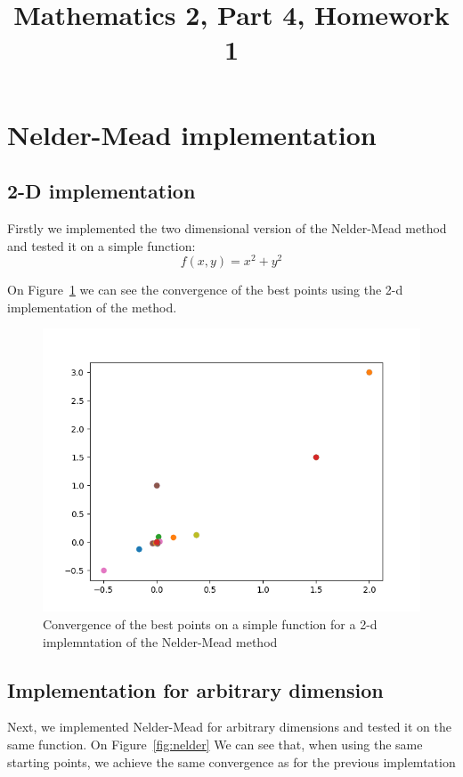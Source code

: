 \documentclass[9pt]{IEEEtran}
\title{\vspace{0ex}
Mathematics 2, Part 4, Homework 1}
\begin{document}
\maketitle
\section{Nelder-Mead implementation}
\subsection*{2-D implementation}
Firstly we implemented the two dimensional version of the Nelder-Mead method
 and tested it on a simple function: 
 \[f(x, y) = x^2 + y^2 \]

 On Figure~\ref{fig:nelder_2d} we can see the convergence of the best points using 
 the 2-d implementation of the method. 

\begin{figure}[h]
    \includegraphics[width=\columnwidth]{convergence1.png}
    \caption{Convergence of the best points on a simple function for a 2-d implemntation 
    of the Nelder-Mead method}
    \label{fig:nelder_2d}
\end{figure}

\subsection*{Implementation for arbitrary dimension}
Next, we implemented Nelder-Mead for arbitrary dimensions and tested it on the 
same function. On Figure~\ref{fig:nelder} We can see that, when using the same starting points, we achieve 
the same convergence as for the previous implemtation
\end{document}

